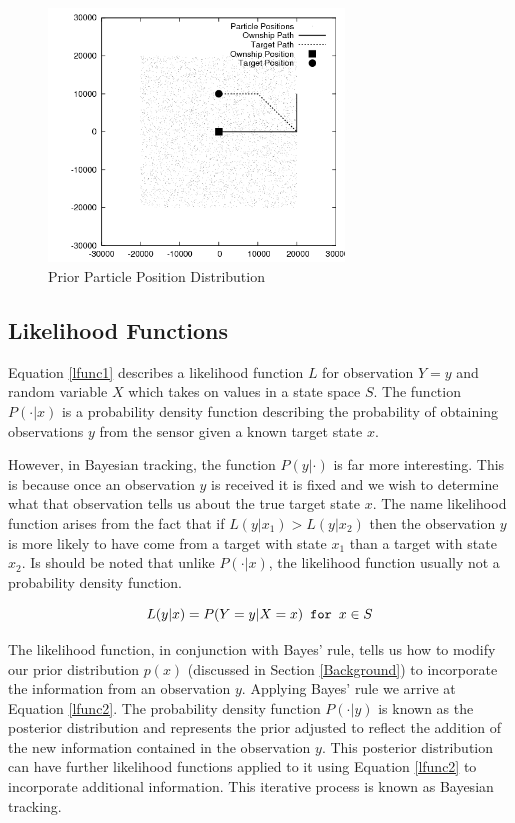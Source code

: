 \documentclass{article}
\begin{document}
\begin{figure}
\centering
\includegraphics[width=0.7\textwidth]{data/particles_prior.png}
\caption{Prior Particle Position Distribution}
\label{prior}
\end{figure}

\subsection{Likelihood Functions}
Equation \ref{lfunc1} describes a likelihood function \(L\) for observation \(Y=y\) and random variable \(X\) which takes on values in a state space \(S\). The function \(P(\cdot|x)\) is a probability density function describing the probability of obtaining observations \(y\) from the sensor given a known target state \(x\).

However, in Bayesian tracking, the function \(P(y|\cdot)\) is far more interesting. This is because once an observation \(y\) is received it is fixed and we wish to determine what that observation tells us about the true target state \(x\). The name likelihood function arises from the fact that if \(L(y|x_{1})>L(y|x_{2})\) then the observation \(y\) is more likely to have come from a target with state \(x_{1}\) than a target with state \(x_{2}\). Is should be noted that unlike \(P(\cdot|x)\), the likelihood function usually not a probability density function.\cite{bmtt}

\begin{equation}\label{lfunc1}
L(y|x) = P( Y=y | X=x ) \verb! for ! x \in S
\end{equation}

The likelihood function, in conjunction with Bayes' rule, tells us how to modify our prior distribution \(p(x)\) (discussed in Section \ref{Background}) to incorporate the information from an observation \(y\). Applying Bayes' rule we arrive at Equation \ref{lfunc2}. The probability density function \(P(\cdot|y)\) is known as the posterior distribution and represents the prior adjusted to reflect the addition of the new information contained in the observation \(y\). This posterior distribution can have further likelihood functions applied to it using Equation \ref{lfunc2} to incorporate additional information. This iterative process is known as Bayesian tracking.
\end{document}
